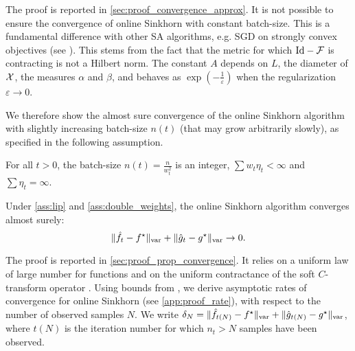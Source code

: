 The proof is reported in \autoref{sec:proof_convergence_approx}. It is not possible
to ensure the convergence of online Sinkhorn with constant batch-size. This is a
fundamental difference with other SA algorithms, e.g. SGD on strongly convex
objectives (see \cite{moulines_non-asymptotic_2011}). This stems from the fact
that the metric for which $\text{Id} - \mathcal{F}$ is contracting is
not a Hilbert norm. The constant $A$ depends on $L$, the diameter of $\mathcal{X}$, the measures $\alpha$ and
$\beta$, and behaves as $\exp(-\frac{1}{\varepsilon})$ when the
regularization $\varepsilon \to 0$.
% 

We therefore show the almost sure convergence of the online Sinkhorn algorithm
with slightly increasing batch-size $n(t)$ (that may grow arbitrarily slowly), as specified in the following
assumption.

\begin{assumption}\label{ass:double_weights}
    For all $t > 0$, the batch-size $n(t) = \frac{n}{w_t^2}$ is an integer, $\sum w_t \eta_t <
    \infty$ and $\sum \eta_t = \infty$.
\end{assumption}

\begin{proposition}\label{prop:convergence_true}
    Under \autoref{ass:lip} and
    \ref{ass:double_weights}, the online Sinkhorn algorithm converges almost surely:
    \begin{equation}
        \Vert \hat f_t - f^\star \Vert_{\text{\upshape var}} + \Vert \hat g_t - g^\star \Vert_{\text{\upshape var}} \to 0.
    \end{equation}
\end{proposition}

The proof is reported in \autoref{sec:proof_prop_convergence}. It relies on a uniform
law of large number for functions \citep[][chapter
19]{van_der_vaart_asymptotic_2000} and on the uniform contractance of the soft
$C$-transform operator \citep[e.g.][Proposition 19]{vialard2019elementary}. Using bounds from \cite{moulines_non-asymptotic_2011}, we derive  asymptotic rates of convergence for online Sinkhorn (see \autoref{app:proof_rate}), with
respect to the number of observed samples $N$. We write $\delta_N = \Vert \hat
f_{t(N)} - f^\star \Vert_{\text{\upshape var}} + \Vert \hat g_{t(N)} - g^\star \Vert_{\text{\upshape var}}$,
where $t(N)$ is the iteration number for which $n_t > N$ samples have been observed.

